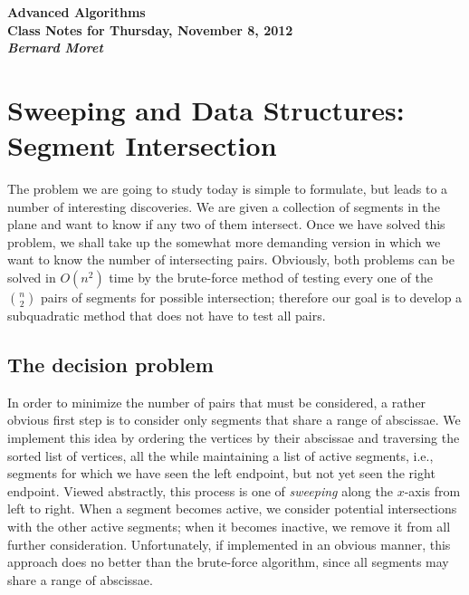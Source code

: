 \documentclass[11pt]{article}
\begin{document}
\begin{center}
  \LARGE\bf Advanced Algorithms\\

  \Large\sf
  Class Notes for Thursday, November 8, 2012\\

  \it
  Bernard Moret
\end{center}

\bigskip


\section{Sweeping and Data Structures: Segment Intersection}
The problem we are going to study today is simple to formulate, but
leads to a number of interesting discoveries.  We are given a collection
of segments in the plane and want to know if any two of them intersect.
Once we have solved this problem, we shall take up the somewhat more
demanding version in which we want to know the number of intersecting
pairs.  Obviously, both problems can be solved in $O(n^2)$ time by
the brute-force method of testing every one of the $n \choose 2$ pairs of
segments for possible intersection; therefore our goal is to develop
a subquadratic method that does not have to test all pairs.

\subsection{The decision problem}
In order to minimize the number of pairs that must be considered,
a rather obvious first step is to consider only segments that share
a range of abscissae.
We implement this idea by ordering the vertices by their
abscissae and traversing the sorted list of vertices, all the while
maintaining a list of active segments, i.e., segments for which we
have seen the left endpoint, but not yet seen the right endpoint.
Viewed abstractly, this process is one of \emph{sweeping} along the $x$-axis
from left to right.  When a segment becomes active, we consider potential
intersections with the other active segments; when it becomes
inactive, we remove it from all further consideration.  Unfortunately, if
implemented in an obvious manner, this approach does no better than the
brute-force algorithm, since all segments may share a range of abscissae.
\end{document}
